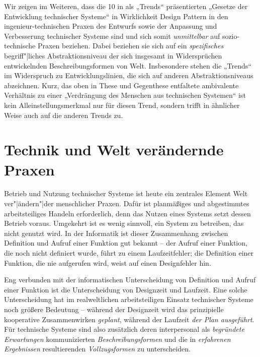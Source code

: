\documentclass[12pt,a4paper]{article}
\begin{document}
Wir zeigen im Weiteren, dass die 10 in \cite{TESE2018} als „Trends“
präsentierten „Gesetze der Entwicklung technischer Systeme“ in Wirklichkeit
Design Pattern in den ingenieur-technischen Praxen des Entwurfs sowie der
Anpassung und Verbesserung technischer Systeme sind und sich somit
\emph{unmittelbar} auf sozio-technische Praxen beziehen. Dabei beziehen sie
sich auf ein \emph{spezifisches} begriff"|liches Abstraktionsniveau der sich
insgesamt in Widersprüchen entwickelnden Beschreibungsformen von
Welt. Insbesondere stehen die „Trends“ im Widerspruch zu Entwicklungslinien,
die sich auf anderen Abstraktionsniveaus abzeichnen. Kurz, das oben in These
und Gegenthese entfaltete ambivalente Verhältnis zu einer „Verdrängung des
Menschen aus technischen Systemen“ ist kein Alleinstellungsmerkmal nur für
diesen Trend, sondern trifft in ähnlicher Weise auch auf die anderen Trends
zu.

\section{Technik und Welt verändernde Praxen}

Betrieb und Nutzung technischer Systeme ist heute ein zentrales Element Welt
ver"|ändern"|der menschlicher Praxen. Dafür ist planmäßiges und abgestimmtes
arbeitsteiliges Handeln erforderlich, denn das Nutzen eines Systems setzt
dessen Betrieb voraus.  Umgekehrt ist es wenig sinnvoll, ein System zu
betreiben, das nicht genutzt wird. In der Informatik ist dieser Zusammenhang
zwischen Definition und Aufruf einer Funktion gut bekannt -- der Aufruf einer
Funktion, die noch nicht definiert wurde, führt zu einem Laufzeitfehler; die
Definition einer Funktion, die nie aufgerufen wird, weist auf einen
Designfehler hin.
\enlargethispage{-1em}

Eng verbunden mit der informatischen Unterscheidung von Definition und Aufruf
einer Funktion ist die Unterscheidung von Designzeit und Laufzeit.  Eine
solche Unterscheidung hat im realweltlichen arbeitsteiligen Einsatz
technischer Systeme noch größere Bedeutung -- während der Designzeit wird das
prinzipielle kooperative Zusammenwirken \emph{geplant}, während der Laufzeit
\emph{der Plan ausgeführt}. Für technische Systeme sind also zusätzlich deren
interpersonal als \emph{begründete Erwartungen} kommunizierten
\emph{Beschreibungsformen} und die in \emph{erfahrenen Ergebnissen}
resultierenden \emph{Vollzugsformen} zu unterscheiden.
\end{document}
